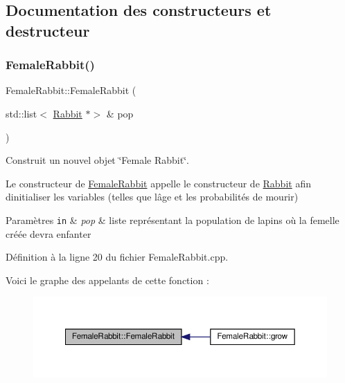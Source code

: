 \subsection{Documentation des constructeurs et destructeur}
\mbox{\label{classFemaleRabbit_a40a2809fb73bb2edf2cf4c4d9147d2d9}} 
\subsubsection{\texorpdfstring{Female\+Rabbit()}{FemaleRabbit()}}
{\footnotesize\ttfamily Female\+Rabbit\+::\+Female\+Rabbit (\begin{DoxyParamCaption}\item[{std\+::list$<$ \hyperlink{classRabbit}{Rabbit} $\ast$$>$ \&}]{pop }\end{DoxyParamCaption})}



Construit un nouvel objet \char`\"{}\+Female Rabbit\char`\"{}. 

Le constructeur de \hyperlink{classFemaleRabbit}{Female\+Rabbit} appelle le constructeur de \hyperlink{classRabbit}{Rabbit} afin d\textquotesingle{}initialiser les variables (telles que l\textquotesingle{}âge et les probabilités de mourir)


\begin{DoxyParams}[1]{Paramètres}
\mbox{\tt in}  & {\em pop} & liste représentant la population de lapins où la femelle créée devra enfanter \\
\hline
\end{DoxyParams}


Définition à la ligne 20 du fichier Female\+Rabbit.\+cpp.

Voici le graphe des appelants de cette fonction \+:
\nopagebreak
\begin{figure}[H]
\begin{center}
\leavevmode
\includegraphics[width=350pt]{classFemaleRabbit_a40a2809fb73bb2edf2cf4c4d9147d2d9_icgraph}
\end{center}
\end{figure}
\mbox{\label{classFemaleRabbit_a952455c7b721ab6acb770078aa5b8d5d}} 
